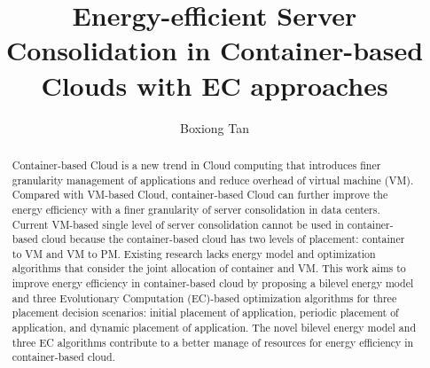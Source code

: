 \documentclass[11pt
              , a4paper
              , twoside
              , openright
              ]{report}
\title{Energy-efficient Server Consolidation in Container-based Clouds with EC approaches}
\author{Boxiong Tan}
\date{}
\begin{document}



\begin{abstract}
Container-based Cloud is a new trend in Cloud computing that introduces finer granularity management of applications and reduce overhead of virtual machine (VM).  Compared with VM-based Cloud, container-based Cloud can further improve the energy efficiency with a finer granularity of server consolidation in data centers. Current VM-based single level of server consolidation cannot be used in container-based cloud because the container-based cloud has two levels of placement: container to VM and VM to PM. Existing research lacks energy model and optimization algorithms that consider the joint allocation of container and VM. 
This work aims to improve energy efficiency in container-based cloud by proposing a bilevel energy model and three Evolutionary Computation (EC)-based optimization algorithms for three placement decision scenarios: initial placement of application, periodic placement of application, and dynamic placement of application. The novel bilevel energy model and three EC algorithms contribute to a better manage of resources for energy efficiency in container-based cloud. 


\end{abstract}


\maketitle

% 

\tableofcontents



\mainmatter









\backmatter



%


\end{document}
